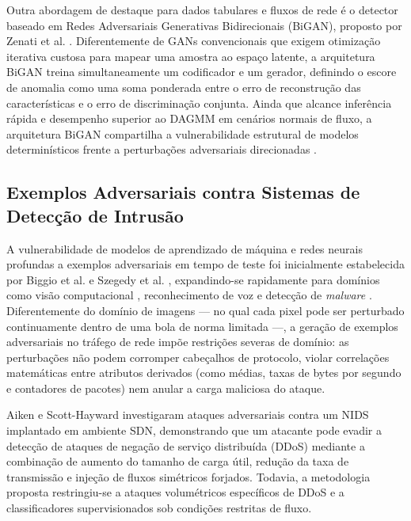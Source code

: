 \documentclass[conference]{IEEEtran}
\begin{document}
Outra abordagem de destaque para dados tabulares e fluxos de rede é o detector baseado em Redes Adversariais Generativas Bidirecionais (BiGAN), proposto por Zenati et al. \cite{zenati2018}.
Diferentemente de GANs convencionais que exigem otimização iterativa custosa para mapear uma amostra ao espaço latente, a arquitetura BiGAN treina simultaneamente um codificador e um gerador, definindo o escore de anomalia como uma soma ponderada entre o erro de reconstrução das características e o erro de discriminação conjunta.
Ainda que alcance inferência rápida e desempenho superior ao DAGMM em cenários normais de fluxo, a arquitetura BiGAN compartilha a vulnerabilidade estrutural de modelos determinísticos frente a perturbações adversariais direcionadas \cite{hashemi2019, hashemi2020}.

\subsection{Exemplos Adversariais contra Sistemas de Detecção de Intrusão}

A vulnerabilidade de modelos de aprendizado de máquina e redes neurais profundas a exemplos adversariais em tempo de teste foi inicialmente estabelecida por Biggio et al. \cite{biggio2013} e Szegedy et al. \cite{szegedy2013}, expandindo-se rapidamente para domínios como visão computacional \cite{sharif2016, eykholt2018}, reconhecimento de voz \cite{carlini2018} e detecção de \textit{malware} \cite{grosse2017}.
Diferentemente do domínio de imagens — no qual cada pixel pode ser perturbado continuamente dentro de uma bola de norma limitada —, a geração de exemplos adversariais no tráfego de rede impõe restrições severas de domínio: as perturbações não podem corromper cabeçalhos de protocolo, violar correlações matemáticas entre atributos derivados (como médias, taxas de bytes por segundo e contadores de pacotes) nem anular a carga maliciosa do ataque.

Aiken e Scott-Hayward \cite{aiken2019} investigaram ataques adversariais contra um NIDS implantado em ambiente SDN, demonstrando que um atacante pode evadir a detecção de ataques de negação de serviço distribuída (DDoS) mediante a combinação de aumento do tamanho de carga útil, redução da taxa de transmissão e injeção de fluxos simétricos forjados.
Todavia, a metodologia proposta restringiu-se a ataques volumétricos específicos de DDoS e a classificadores supervisionados sob condições restritas de fluxo.
\end{document}
